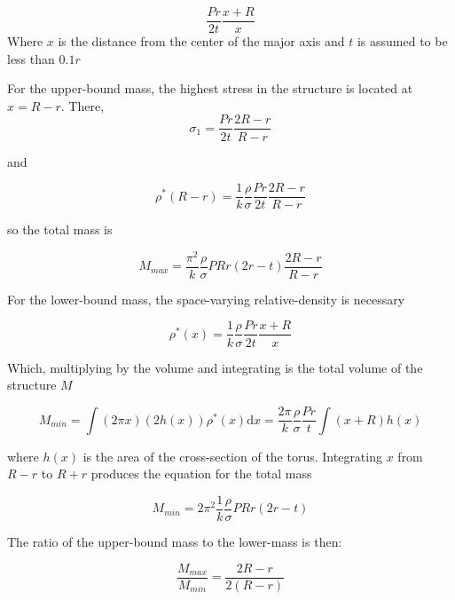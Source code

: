 \documentclass[twocolumn,letterpaper]{IEEEAerospaceCLS}  %
\begin{document}
\begin{equation}
\frac{Pr}{2t}\frac{x+R}{x}
\end{equation}
Where $x$ is the distance from the center of the major axis and $t$ is assumed to be less than $0.1 r$\cite{young2002roark}

For the upper-bound mass, the highest stress in the structure is located at $x = R-r$. There, 
\begin{equation}
\sigma_1 = \frac{Pr}{2t}\frac{2R-r}{R-r}
\end{equation}

and 

\begin{equation}
\rho^*(R-r) = \frac{1}{k}\frac{\rho}{\sigma}\frac{Pr}{2t}\frac{2R-r}{R-r}
\end{equation}

so the total mass is

\begin{equation}
M_{max} = \frac{\pi^2}{k}\frac{\rho}{\sigma}PRr\left(2r-t\right)\frac{2R-r}{R-r}
\end{equation}

For the lower-bound mass, the space-varying relative-density is necessary

\begin{equation}
\rho^*(x) = \frac{1}{k}\frac{\rho}{\sigma}\frac{Pr}{2t}\frac{x+R}{x}
\end{equation}

Which, multiplying by the volume and integrating is the total volume of the structure $M$

\begin{equation}
M_{min} = \int{(2\pi x)(2 h(x)) \rho^*(x)\textrm{d}x}
  = \frac{2\pi}{k}\frac{\rho}{\sigma}\frac{Pr}{t}\int{(x+R)h(x)}
\end{equation}

where $h(x)$ is the area of the cross-section of the torus. Integrating $x$ from $R-r$ to $R+r$ produces the equation for the total mass

\begin{equation}
M_{min} = 2\pi^2\frac{1}{k}\frac{\rho}{\sigma}PRr(2r-t)
\end{equation}

The ratio of the upper-bound mass to the lower-mass is then:

\begin{equation}
\frac{M_{max}}{M_{min}} = \frac{2R-r}{2(R-r)}
\end{equation}

\end{document}

